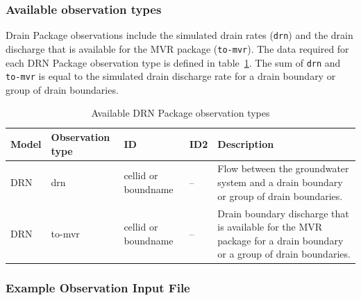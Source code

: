 \vspace{5mm}
\subsubsection{Available observation types}
Drain Package observations include the simulated drain rates (\texttt{drn}) and the drain discharge that is available for the MVR package (\texttt{to-mvr}). The data required for each DRN Package observation type is defined in table~\ref{table:gwf-drngobstype}. The sum of \texttt{drn} and \texttt{to-mvr} is equal to the simulated drain discharge rate for a drain boundary or group of drain boundaries.

\begin{longtable}{p{2cm} p{2.75cm} p{2cm} p{1.25cm} p{7cm}}
\caption{Available DRN Package observation types} \tabularnewline

\hline
\hline
\textbf{Model} & \textbf{Observation type} & \textbf{ID} & \textbf{ID2} & \textbf{Description} \\
\hline
\endhead

\hline
\endfoot

DRN & drn & cellid or boundname & -- & Flow between the groundwater system and a drain boundary or group of drain boundaries. \\
DRN & to-mvr & cellid or boundname & -- & Drain boundary discharge that is available for the MVR package for a drain boundary or a group of drain boundaries.
\label{table:gwf-drngobstype}
\end{longtable}

\vspace{5mm}
\subsubsection{Example Observation Input File}

